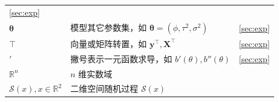 \documentclass[12pt,a4paper,UTF8,twoside]{book}
\theoremstyle{definition}
\theoremstyle{definition}
\theoremstyle{definition}
\theoremstyle{remark}
\begin{document}
\begin{longtable}[]{@{}llc@{}}
\begin{minipage}[t]{0.14\columnwidth}
\ref{sec:exp}\strut
\end{minipage}\tabularnewline
\begin{minipage}[t]{0.15\columnwidth}\raggedright
\(\boldsymbol{\theta}\)\strut
\end{minipage} & \begin{minipage}[t]{0.63\columnwidth}\raggedright
模型其它参数集，如
\(\boldsymbol{\theta} = (\phi,\tau^2,\sigma^2)\)\strut
\end{minipage} & \begin{minipage}[t]{0.14\columnwidth}\centering
\ref{sec:exp}\strut
\end{minipage}\tabularnewline
\begin{minipage}[t]{0.15\columnwidth}\raggedright
\(\top\)\strut
\end{minipage} & \begin{minipage}[t]{0.63\columnwidth}\raggedright
向量或矩阵转置，如 \(\mathbf{y}^{\top},\mathbf{X}^\top\)\strut
\end{minipage} & \begin{minipage}[t]{0.14\columnwidth}\centering
\ref{sec:exp}\strut
\end{minipage}\tabularnewline
\begin{minipage}[t]{0.15\columnwidth}\raggedright
\('\)\strut
\end{minipage} & \begin{minipage}[t]{0.63\columnwidth}\raggedright
撇号表示一元函数求导，如 \(b'(\theta),b''(\theta)\)\strut
\end{minipage} & \begin{minipage}[t]{0.14\columnwidth}\centering
\ref{sec:exp}\strut
\end{minipage}\tabularnewline
\begin{minipage}[t]{0.15\columnwidth}\raggedright
\(\mathbb{R}^n\)\strut
\end{minipage} & \begin{minipage}[t]{0.63\columnwidth}\raggedright
\(n\) 维实数域\strut
\end{minipage} & \begin{minipage}[t]{0.14\columnwidth}\centering
\strut
\end{minipage}\tabularnewline
\begin{minipage}[t]{0.15\columnwidth}\raggedright
\(\mathcal{S}(x),x \in \mathbb{R}^2\)\strut
\end{minipage} & \begin{minipage}[t]{0.63\columnwidth}\raggedright
二维空间随机过程 \(\mathcal{S}(x)\)\strut
\end{minipage} & \begin{minipage}[t]{0.14\columnwidth}\centering

\end{minipage}
\end{longtable}
\end{document}
